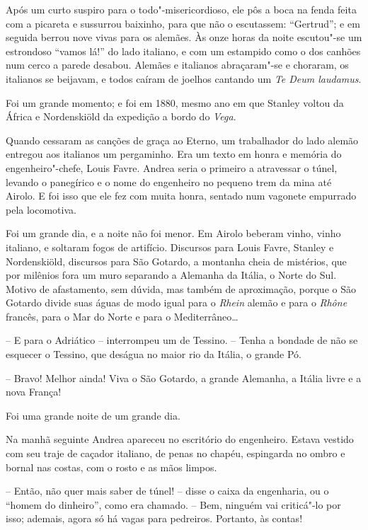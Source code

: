 Após um curto suspiro para o todo"-misericordioso, ele pôs a boca na
fenda feita com a picareta e sussurrou baixinho, para que não o
escutassem: ``Gertrud''; e em seguida berrou nove vivas para os alemães.
Às onze horas da noite escutou"-se um estrondoso ``vamos lá!'' do lado
italiano, e com um estampido como o dos canhões num cerco a parede
desabou. Alemães e italianos abraçaram"-se e \mbox{choraram}, os italianos se
beijavam, e todos caíram de joelhos cantando um \textit{Te Deum
laudamus}.

Foi um grande momento; e foi em 1880, mesmo ano em que Stanley voltou da
África e Nordenskiöld da expedição a bordo do \textit{Vega}.

Quando cessaram as canções de graça ao Eterno, um trabalhador do lado
alemão entregou aos italianos um pergaminho. Era um
texto em honra e memória do engenheiro"-chefe, Louis Favre. Andrea
seria o primeiro a atravessar o túnel, levando o panegírico e o nome do
engenheiro no pequeno trem da mina até Airolo. E foi isso que ele fez
com muita honra, sentado num vagonete empurrado pela locomotiva.

Foi um grande dia, e a noite não foi menor. Em Airolo beberam vinho,
vinho italiano, e soltaram fogos de artifício. Discursos para Louis
Favre, Stanley e Nordenskiöld, discursos para São Gotardo, a montanha
cheia de mistérios, que por milênios fora um muro separando a Alemanha
da Itália, o Norte do Sul. Motivo de afastamento, sem dúvida, mas
também de aproximação, porque o São Gotardo divide suas águas de modo
igual para o \textit{Rhein} alemão e para o \textit{Rhône} francês,
para o Mar do Norte e para o Mediterrâneo\ldots{}

-- E para o Adriático -- interrompeu um de Tessino. -- Tenha a bondade de
não se esquecer o Tessino, que deságua no maior rio da Itália, o grande
Pó.

-- Bravo! Melhor ainda! Viva o São Gotardo, a grande Alemanha, a Itália
livre e a nova França!

Foi uma grande noite de um grande dia.
\asterisc

\pagebreak
Na manhã seguinte Andrea apareceu no escritório do engenheiro. Estava
vestido com seu traje de caçador italiano, de penas no chapéu,
espingarda no ombro e bornal nas costas, com o rosto e as mãos limpos.

-- Então, não quer mais saber de túnel! -- disse o caixa da engenharia, ou
o ``homem do dinheiro'', como era chamado. -- Bem, ninguém vai
criticá"-lo por isso; ademais, agora só há vagas para pedreiros.
Portanto, às contas!

